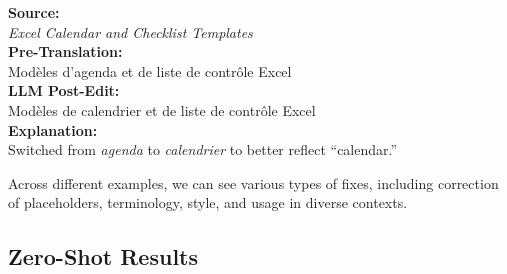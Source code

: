\documentclass[11pt]{article}
\theoremstyle{plain}
\theoremstyle{definition}
\theoremstyle{remark}
\begin{document}
\begin{tcbraster}[raster columns=2, raster equal height=rows,
                  raster column skip=3mm, raster row skip=3mm]
\begin{tcolorbox}[nobeforeafter, title=French (fr-FR),
    boxsep=2pt,
    arc=2pt,
    left=3pt,
    right=3pt,
    colback=gray!5,
    colframe=gray!75!black]
\textbf{Source:}\\
\emph{Excel Calendar and Checklist Templates}\\[3pt]
\textbf{Pre-Translation:}\\
Modèles d’agenda et de liste de contrôle Excel\\[3pt]
\textbf{LLM Post-Edit:}\\
Modèles de calendrier et de liste de contrôle Excel\\[3pt]
\textbf{Explanation:}\\
Switched from \emph{agenda} to \emph{calendrier} to better reflect ``calendar.''
\end{tcolorbox}

\end{tcbraster}
\endgroup

\noindent
Across different examples, we can see various types of fixes, including correction of placeholders, terminology, style, and usage in diverse contexts.
\newpage
\subsection{Zero-Shot Results}
\label{sec:zero-shot}
\end{document}
